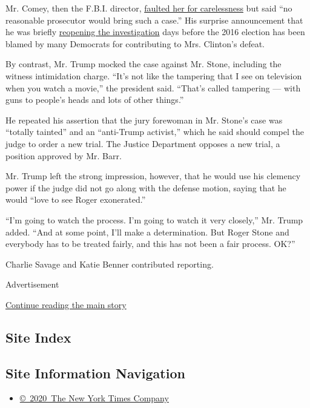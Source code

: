 Mr. Comey, then the F.B.I. director,
\href{https://www.nytimes3xbfgragh.onion/2016/07/06/us/politics/hillary-clinton-fbi-email-comey.html}{faulted
her for carelessness} but said ``no reasonable prosecutor would bring
such a case.'' His surprise announcement that he was briefly
\href{https://www.nytimes3xbfgragh.onion/2016/10/29/us/politics/fbi-hillary-clinton-email.html}{reopening
the investigation} days before the 2016 election has been blamed by many
Democrats for contributing to Mrs. Clinton's defeat.

By contrast, Mr. Trump mocked the case against Mr. Stone, including the
witness intimidation charge. ``It's not like the tampering that I see on
television when you watch a movie,'' the president said. ``That's called
tampering --- with guns to people's heads and lots of other things.''

He repeated his assertion that the jury forewoman in Mr. Stone's case
was ``totally tainted'' and an ``anti-Trump activist,'' which he said
should compel the judge to order a new trial. The Justice Department
opposes a new trial, a position approved by Mr. Barr.

Mr. Trump left the strong impression, however, that he would use his
clemency power if the judge did not go along with the defense motion,
saying that he would ``love to see Roger exonerated.''

``I'm going to watch the process. I'm going to watch it very closely,''
Mr. Trump added. ``And at some point, I'll make a determination. But
Roger Stone and everybody has to be treated fairly, and this has not
been a fair process. OK?''

Charlie Savage and Katie Benner contributed reporting.

Advertisement

\protect\hyperlink{after-bottom}{Continue reading the main story}

\hypertarget{site-index}{%
\subsection{Site Index}\label{site-index}}

\hypertarget{site-information-navigation}{%
\subsection{Site Information
Navigation}\label{site-information-navigation}}

\begin{itemize}
\tightlist
\item
  \href{https://help.nytimes3xbfgragh.onion/hc/en-us/articles/115014792127-Copyright-notice}{©~2020~The
  New York Times Company}
\end{itemize}

